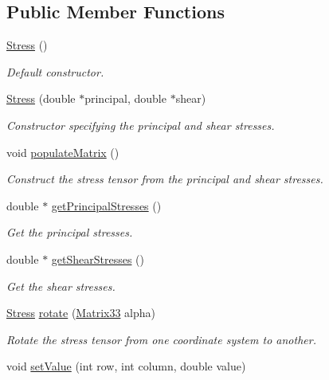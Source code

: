 \subsection*{\-Public \-Member \-Functions}
\begin{DoxyCompactItemize}
\item 
\hyperlink{classStress_aa01e83a3f6791cbadc5a368e3a40515e}{\-Stress} ()
\begin{DoxyCompactList}\small\item\em \-Default constructor. \end{DoxyCompactList}\item 
\hyperlink{classStress_ae4e2f6250e3bdd4d3d78a9c6bdde7bab}{\-Stress} (double $\ast$principal, double $\ast$shear)
\begin{DoxyCompactList}\small\item\em \-Constructor specifying the principal and shear stresses. \end{DoxyCompactList}\item 
void \hyperlink{classStress_aa395d5763df8feb4689e0c5524c9e562}{populate\-Matrix} ()
\begin{DoxyCompactList}\small\item\em \-Construct the stress tensor from the principal and shear stresses. \end{DoxyCompactList}\item 
double $\ast$ \hyperlink{classStress_aca57d2719f43701dd2ebf2ab00afa539}{get\-Principal\-Stresses} ()
\begin{DoxyCompactList}\small\item\em \-Get the principal stresses. \end{DoxyCompactList}\item 
double $\ast$ \hyperlink{classStress_afe8214b8e9061930e6598e1970fd61f5}{get\-Shear\-Stresses} ()
\begin{DoxyCompactList}\small\item\em \-Get the shear stresses. \end{DoxyCompactList}\item 
\hyperlink{classStress}{\-Stress} \hyperlink{classStress_a61fa75450c0232bb0fa427072d1b6a35}{rotate} (\hyperlink{classMatrix33}{\-Matrix33} alpha)
\begin{DoxyCompactList}\small\item\em \-Rotate the stress tensor from one coordinate system to another. \end{DoxyCompactList}\item 
void \hyperlink{classMatrix33_a6cdcec77fd089b2e73ad7ae85ecff30b}{set\-Value} (int row, int column, double value)

\end{DoxyCompactItemize}
